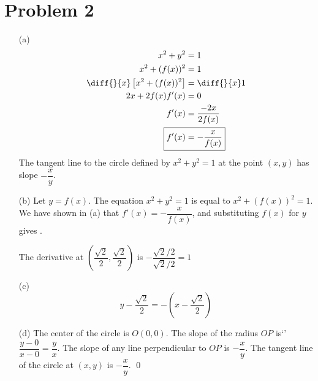 \documentclass{article}
\begin{document}
\section*{Problem 2}
\begin{itemize}
\item[(a)]
	\begin{align*}
		x^2+y^2&=1 \\
		x^2+(f(x))^2&=1 \\
		\diff{}{x}\left[x^2+(f(x))^2\right]&=\diff{}{x}1 \\
		2x+2f(x)f'(x)&=0 \\
		f'(x)&=\frac{-2x}{2f(x)} \\
		\Aboxed{f'(x)&=-\frac{x}{f(x)}}
	\end{align*}
	The tangent line to the circle defined by $x^2+y^2=1$ at the point $(x,y)$ has slope $-\dfrac{x}{y}$.

\item[(b)]
	Let $y=f(x)$. The equation $x^2+y^2=1$ is equal to $x^2+(f(x))^2=1$. We have shown in (a) that $f'(x)=-\dfrac{x}{f(x)}$, and substituting $f(x)$ for $y$ gives .

	The derivative at $\left(\dfrac{\sqrt{2}}{2},\dfrac{\sqrt{2}}{2}\right)$ is $-\dfrac{\sqrt{2}/2}{\sqrt{2}/2}=\boxed{1}$
	
\item[(c)]
	\begin{equation*}
		\boxed{y-\frac{\sqrt{2}}{2}=-\left(x-\frac{\sqrt{2}}{2}\right)}
	\end{equation*}

\item[(d)]
	The center of the circle is $O(0,0)$. The slope of the radius $OP$ is`' $\dfrac{y-0}{x-0}=\dfrac{y}{x}$. The slope of any line perpendicular to $OP$ is $-\dfrac{x}{y}$. The tangent line of the circle at $(x,y)$ is $-\dfrac{x}{y}$. \qed
\end{itemize}
\end{document}
